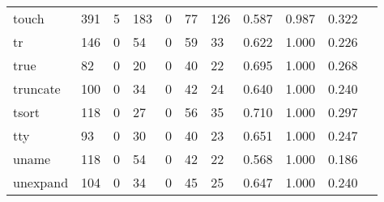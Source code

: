 \begin{longtable}{lp{1.10cm}p{1.10cm}p{1.10cm}p{1.10cm}p{1.10cm}p{1.10cm}p{1.10cm}p{1.10cm}p{1.10cm}p{1.10cm}}
touch     &                    391 &                                  5 &                               183 &                                0 &                                77 &                             126 &                          0.587 &                                 0.987 &                               0.322 \\
tr        &                    146 &                                  0 &                                54 &                                0 &                                59 &                              33 &                          0.622 &                                 1.000 &                               0.226 \\
true      &                     82 &                                  0 &                                20 &                                0 &                                40 &                              22 &                          0.695 &                                 1.000 &                               0.268 \\
truncate  &                    100 &                                  0 &                                34 &                                0 &                                42 &                              24 &                          0.640 &                                 1.000 &                               0.240 \\
tsort     &                    118 &                                  0 &                                27 &                                0 &                                56 &                              35 &                          0.710 &                                 1.000 &                               0.297 \\
tty       &                     93 &                                  0 &                                30 &                                0 &                                40 &                              23 &                          0.651 &                                 1.000 &                               0.247 \\
uname     &                    118 &                                  0 &                                54 &                                0 &                                42 &                              22 &                          0.568 &                                 1.000 &                               0.186 \\
unexpand  &                    104 &                                  0 &                                34 &                                0 &                                45 &                              25 &                          0.647 &                                 1.000 &                               0.240 \\

\end{longtable}
